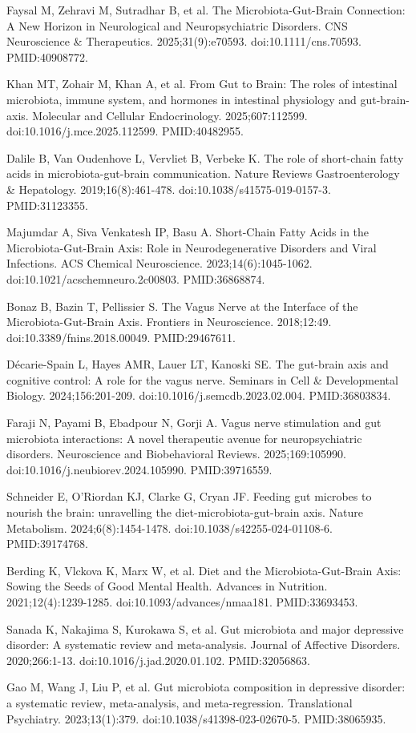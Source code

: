 \documentclass[11pt,oneside]{book}
\newcommand{\reff}[2]{\par\hangindent=7mm\hangafter=1\noindent[#1]\hspace{2mm}#2\par}
\begin{document}
\reff{23}{Faysal M, Zehravi M, Sutradhar B, et al. The Microbiota-Gut-Brain Connection: A New Horizon in Neurological and Neuropsychiatric Disorders. CNS Neuroscience \& Therapeutics. 2025;31(9):e70593. doi:10.1111/cns.70593. PMID:40908772.}
\reff{24}{Khan MT, Zohair M, Khan A, et al. From Gut to Brain: The roles of intestinal microbiota, immune system, and hormones in intestinal physiology and gut-brain-axis. Molecular and Cellular Endocrinology. 2025;607:112599. doi:10.1016/j.mce.2025.112599. PMID:40482955.}
\reff{25}{Dalile B, Van Oudenhove L, Vervliet B, Verbeke K. The role of short-chain fatty acids in microbiota-gut-brain communication. Nature Reviews Gastroenterology \& Hepatology. 2019;16(8):461-478. doi:10.1038/s41575-019-0157-3. PMID:31123355.}
\reff{26}{Majumdar A, Siva Venkatesh IP, Basu A. Short-Chain Fatty Acids in the Microbiota-Gut-Brain Axis: Role in Neurodegenerative Disorders and Viral Infections. ACS Chemical Neuroscience. 2023;14(6):1045-1062. doi:10.1021/acschemneuro.2c00803. PMID:36868874.}
\reff{27}{Bonaz B, Bazin T, Pellissier S. The Vagus Nerve at the Interface of the Microbiota-Gut-Brain Axis. Frontiers in Neuroscience. 2018;12:49. doi:10.3389/fnins.2018.00049. PMID:29467611.}
\reff{28}{Décarie-Spain L, Hayes AMR, Lauer LT, Kanoski SE. The gut-brain axis and cognitive control: A role for the vagus nerve. Seminars in Cell \& Developmental Biology. 2024;156:201-209. doi:10.1016/j.semcdb.2023.02.004. PMID:36803834.}
\reff{29}{Faraji N, Payami B, Ebadpour N, Gorji A. Vagus nerve stimulation and gut microbiota interactions: A novel therapeutic avenue for neuropsychiatric disorders. Neuroscience and Biobehavioral Reviews. 2025;169:105990. doi:10.1016/j.neubiorev.2024.105990. PMID:39716559.}
\reff{30}{Schneider E, O'Riordan KJ, Clarke G, Cryan JF. Feeding gut microbes to nourish the brain: unravelling the diet-microbiota-gut-brain axis. Nature Metabolism. 2024;6(8):1454-1478. doi:10.1038/s42255-024-01108-6. PMID:39174768.}
\reff{31}{Berding K, Vlckova K, Marx W, et al. Diet and the Microbiota-Gut-Brain Axis: Sowing the Seeds of Good Mental Health. Advances in Nutrition. 2021;12(4):1239-1285. doi:10.1093/advances/nmaa181. PMID:33693453.}
\reff{32}{Sanada K, Nakajima S, Kurokawa S, et al. Gut microbiota and major depressive disorder: A systematic review and meta-analysis. Journal of Affective Disorders. 2020;266:1-13. doi:10.1016/j.jad.2020.01.102. PMID:32056863.}
\reff{33}{Gao M, Wang J, Liu P, et al. Gut microbiota composition in depressive disorder: a systematic review, meta-analysis, and meta-regression. Translational Psychiatry. 2023;13(1):379. doi:10.1038/s41398-023-02670-5. PMID:38065935.}
\end{document}
